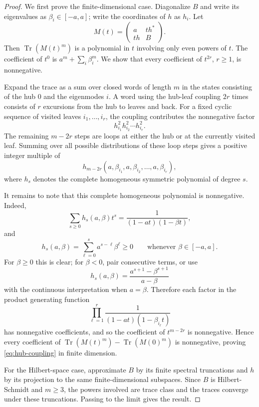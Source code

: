 \documentclass[11pt]{article}
\theoremstyle{definition}
\theoremstyle{remark}
\newcommand{\Tr}{\operatorname{Tr}}
\newcommand{\0}{\mathbf 0}
\begin{document}
\begin{proof}
We first prove the finite-dimensional case.  Diagonalize $B$ and write its eigenvalues as $\beta_i\in[-a,a]$; write the coordinates of $h$ as $h_i$.  Let
\[
        M(t)=
        \begin{pmatrix}
        a & t h^*\\
        t h & B
        \end{pmatrix}.
\]
Then $\Tr(M(t)^m)$ is a polynomial in $t$ involving only even powers of $t$.  The coefficient of $t^0$ is $a^m+\sum_i\beta_i^m$.  We show that every coefficient of $t^{2r}$, $r\ge1$, is nonnegative.

Expand the trace as a sum over closed words of length $m$ in the states consisting of the hub $0$ and the eigenmodes $i$.  A word using the hub-leaf coupling $2r$ times consists of $r$ excursions from the hub to leaves and back.  For a fixed cyclic sequence of visited leaves $i_1,\ldots,i_r$, the coupling contributes the nonnegative factor
\[
        h_{i_1}^2h_{i_2}^2\cdots h_{i_r}^2.
\]
The remaining $m-2r$ steps are loops at either the hub or at the currently visited leaf.  Summing over all possible distributions of these loop steps gives a positive integer multiple of
\[
        h_{m-2r}(a,\beta_{i_1},a,\beta_{i_2},\ldots,a,\beta_{i_r}),
\]
where $h_s$ denotes the complete homogeneous symmetric polynomial of degree $s$.

It remains to note that this complete homogeneous polynomial is nonnegative.  Indeed,
\[
        \sum_{s\ge0}h_s(a,\beta)t^s
        =\frac1{(1-at)(1-\beta t)},
\]
and
\[
        h_s(a,\beta)=\sum_{\ell=0}^s a^{s-\ell}\beta^\ell\ge0
        \qquad\text{whenever }\beta\in[-a,a].
\]
For $\beta\ge0$ this is clear; for $\beta<0$, pair consecutive terms, or use
\[
        h_s(a,\beta)=\frac{a^{s+1}-\beta^{s+1}}{a-\beta}
\]
with the continuous interpretation when $a=\beta$.  Therefore each factor in the product generating function
\[
        \prod_{\ell=1}^r \frac1{(1-at)(1-\beta_{i_\ell}t)}
\]
has nonnegative coefficients, and so the coefficient of $t^{m-2r}$ is nonnegative.  Hence every coefficient of $\Tr(M(t)^m)-\Tr(M(0)^m)$ is nonnegative, proving \eqref{eq:hub-coupling} in finite dimension.

For the Hilbert-space case, approximate $B$ by its finite spectral truncations and $h$ by its projection to the same finite-dimensional subspaces.  Since $B$ is Hilbert-Schmidt and $m\ge3$, the powers involved are trace class and the traces converge under these truncations.  Passing to the limit gives the result.
\end{proof}
\end{document}
